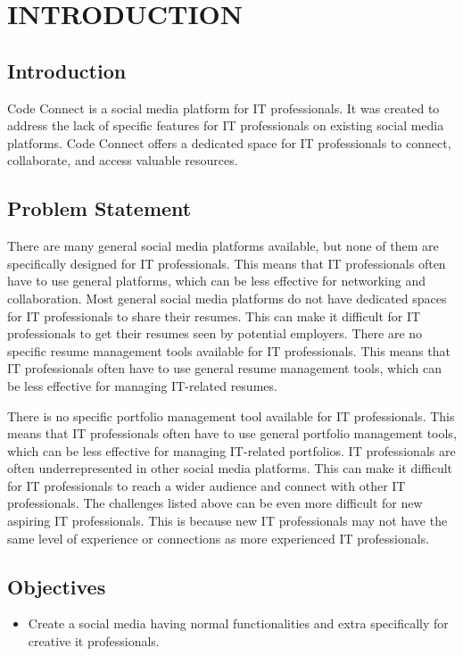 \chapter{INTRODUCTION}



\section{Introduction}
Code Connect is a social media platform for IT professionals. It was created to address the lack of specific features for IT professionals on existing social media platforms. Code Connect offers a dedicated space for IT professionals to connect, collaborate, and access valuable resources.
\section{Problem Statement}

There are many general social media platforms available, but none of them are specifically designed for IT professionals. This means that IT professionals often have to use general platforms, which can be less effective for networking and collaboration.
Most general social media platforms do not have dedicated spaces for IT professionals to share their resumes. This can make it difficult for IT professionals to get their resumes seen by potential employers.
There are no specific resume management tools available for IT professionals. This means that IT professionals often have to use general resume management tools, which can be less effective for managing IT-related resumes.

There is no specific portfolio management tool available for IT professionals. This means that IT professionals often have to use general portfolio management tools, which can be less effective for managing IT-related portfolios.
IT professionals are often underrepresented in other social media platforms. This can make it difficult for IT professionals to reach a wider audience and connect with other IT professionals.
The challenges listed above can be even more difficult for new aspiring IT professionals. This is because new IT professionals may not have the same level of experience or connections as more experienced IT professionals.
\section{Objectives}
\begin{itemize}
    \item Create a social media having normal functionalities and extra specifically  for creative it professionals.
\end{itemize}
